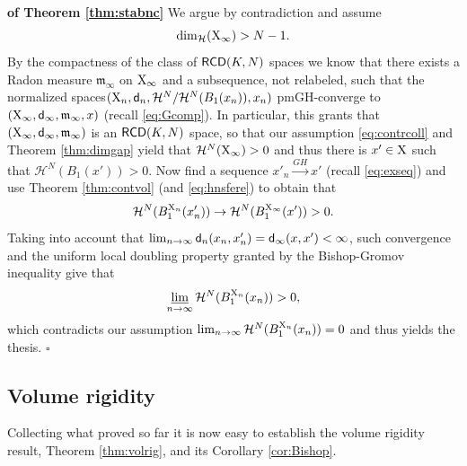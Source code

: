 \documentclass[reqno,11pt]{article}
\numberwithin{equation}{section}
\newcommand{\mm}{{\mbox{\boldmath$m$}}}
\newcommand{\sfd}{{\sf d}}
\newcommand{\limi}{\varliminf}
\renewcommand{\mm}{\mathfrak m}                                %
\newenvironment{proofb}{\removelastskip\par\medskip   %
\noindent{\em{\bf Proof}} \rm}{\penalty-20\null\hfill$\square$\par\medbreak}
\newcommand{\X}{{\rm X}}
\newcommand{\RCD}{{\sf RCD}}
\newcommand{\HH}{{\mathcal H}}
\begin{document}
\begin{proofb}{\bf of Theorem \ref{thm:stabnc}}
 We argue by contradiction and assume 
\begin{equation}
\label{eq:contrcoll}
\dim_\HH(\X_\infty)> N -1.
\end{equation}
By  the compactness of the class of $\RCD(K,N)$ spaces  we know that there exists a Radon measure $\mm_\infty$ on $\X_\infty$ and a subsequence, not relabeled, such that the normalized spaces\linebreak $(\X_n,\sfd_n,{\HH^N}/\HH^N(B_1(x_n)),x_n)$ pmGH-converge to $(\X_\infty,\sfd_\infty,\mm_\infty,x)$ (recall \eqref{eq:Gcomp}). In particular, this grants that $(\X_\infty,\sfd_\infty,\mm_\infty)$ is an $\RCD(K,N)$ space, so that our assumption \eqref{eq:contrcoll} and Theorem \ref{thm:dimgap}  yield that $\HH^N(\X_\infty)>0$ and thus there is $x'\in\X$ such that $\HH^N(B_1(x'))>0$. Now find a sequence $x'_n\stackrel{GH}\to x'$ (recall \eqref{eq:exseq}) and use   Theorem \ref{thm:contvol} (and \eqref{eq:hnsfere}) to obtain that
\[
\HH^N(B^{\X_n}_1(x_n'))\to\HH^N(B^{\X_\infty}_1(x'))>0.
\]
Taking into account that $\lim_{n\to\infty }\sfd_n(x_n,x_n')=\sfd_\infty(x,x')<\infty$, such convergence and the uniform local doubling property granted by the Bishop-Gromov inequality give that
\[
\limi_{n\to\infty}\HH^N(B^{\X_n}_1(x_n))>0,
\]
which contradicts our assumption $\lim_{n\to\infty}\HH^N(B^{\X_n}_1(x_n))=0$ and thus yields the thesis.
\end{proofb}

\subsection{Volume rigidity}
{
Collecting what proved so far it is now easy to establish the volume rigidity result, Theorem \ref{thm:volrig}, and its  Corollary \ref{cor:Bishop}.
}
\end{document}
